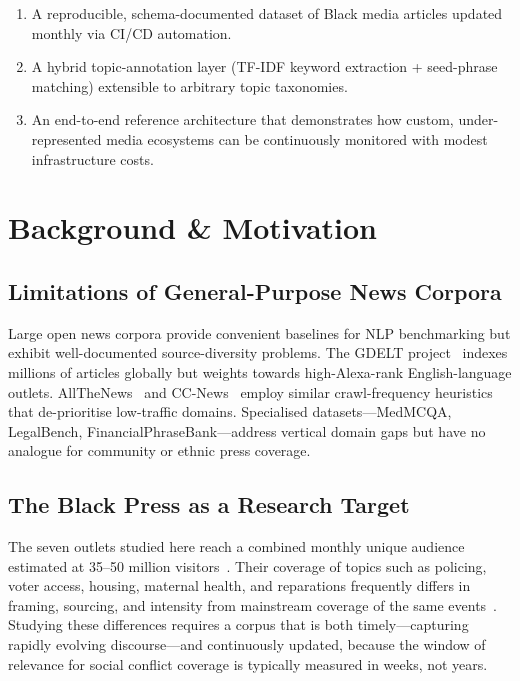 \documentclass[sigconf,anonymous,review]{acmart}
\begin{document}
\begin{enumerate}
  \item A reproducible, schema-documented dataset of Black media articles updated
        monthly via CI/CD automation.
  \item A hybrid topic-annotation layer (TF-IDF keyword extraction + seed-phrase
        matching) extensible to arbitrary topic taxonomies.
  \item An end-to-end reference architecture that demonstrates how custom,
        under-represented media ecosystems can be continuously monitored with
        modest infrastructure costs.
\end{enumerate}

\section{Background \& Motivation}

\subsection{Limitations of General-Purpose News Corpora}

Large open news corpora provide convenient baselines for NLP benchmarking but
exhibit well-documented source-diversity problems.
The GDELT project~\cite{leetaru2013gdelt} indexes millions of articles globally
but weights towards high-Alexa-rank English-language outlets.
AllTheNews~\cite{thompson2017allnews} and CC-News~\cite{nagel2016ccnews} employ
similar crawl-frequency heuristics that de-prioritise low-traffic domains.
Specialised datasets—MedMCQA, LegalBench, FinancialPhraseBank—address vertical
domain gaps but have no analogue for community or ethnic press coverage.

\subsection{The Black Press as a Research Target}

The seven outlets studied here reach a combined monthly unique audience estimated
at 35–50 million visitors~\cite{similarweb2024}.
Their coverage of topics such as policing, voter access, housing, maternal
health, and reparations frequently differs in framing, sourcing, and intensity
from mainstream coverage of the same events~\cite{entman2000black}.
Studying these differences requires a corpus that is both timely—capturing
rapidly evolving discourse—and continuously updated, because the window of
relevance for social conflict coverage is typically measured in weeks, not years.
\end{document}

